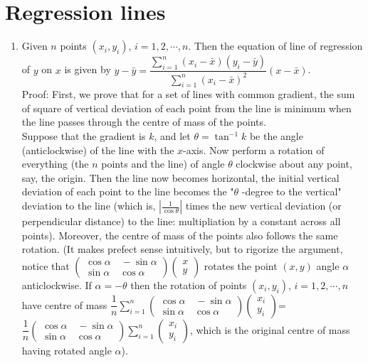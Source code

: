 \documentclass[11pt,a4paper]{article}
\begin{document}
\section {Regression lines}
\begin {enumerate}
\item Given $n$ points $(x_i, y_i)$, $i=1,2,\cdots , n$. Then the equation of line of regression of $y$ on $x$ is given by $y-\bar{y}=\dfrac{\displaystyle\sum_{i=1}^{n}(x_i-\bar{x})(y_i-\bar{y})}{\displaystyle\sum_{i=1}^{n}(x_i-\bar{x})^{2}}(x-\bar{x})$.\\
Proof: First, we prove that for a set of lines with common gradient, the sum of square of vertical deviation of each point from the line is minimum when the line passes through the centre of mass of the points.\\ Suppose that the gradient is $k$, and let $\theta=\tan^{-1} k$ be the angle (anticlockwise) of the line with the $x$-axis. Now perform a rotation of everything (the $n$ points and the line) of angle $\theta$ clockwise about any point, say, the origin. Then the line now becomes horizontal, the initial vertical deviation of each point to the line becomes the "$\theta$ -degree to the vertical" deviation to the line (which is, $|\frac{1}{\cos\theta}|$ times the new vertical deviation (or perpendicular distance) to the line: multipliation by a constant across all points). Moreover, the centre of mass of the points also follows the same rotation. (It makes prefect sense intuitively, but to rigorize the argument, notice that $\left(\begin{array}{cc} \cos\alpha\quad -\sin\alpha\\ \sin\alpha \quad \cos\alpha\end{array}\right)\left(\begin{array}{cc} x\\ y\end{array}\right)$ rotates the point $(x,y)$ angle $\alpha$ anticlockwise. If $\alpha=-\theta$ then the rotation of points $(x_i, y_i)$, $i=1,2,\cdots , n$ have centre of mass $\dfrac{1}{n}\displaystyle\sum_{i=1}^{n} \left(\begin{array}{cc} \cos\alpha\quad -\sin\alpha\\ \sin\alpha \quad \cos\alpha\end{array}\right)\left(\begin{array}{cc} x_i\\ y_i\end{array}\right)$=$\dfrac{1}{n}\left(\begin{array}{cc} \cos\alpha\quad -\sin\alpha\\ \sin\alpha \quad \cos\alpha\end{array}\right)\displaystyle\sum_{i=1}^{n}\left(\begin{array}{cc} x_i\\ y_i\end{array}\right)$, which is the original centre of mass having rotated angle $\alpha$).


\end{enumerate}
\end{document}
